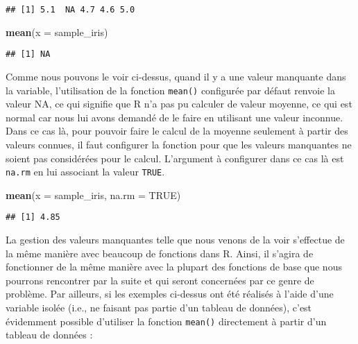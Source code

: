 \documentclass[
  french,
]{book}
\newenvironment{Shaded}{\begin{snugshade}}{\end{snugshade}}
\newcommand{\DataTypeTok}[1]{\textcolor[rgb]{0.13,0.29,0.53}{#1}}
\newcommand{\KeywordTok}[1]{\textcolor[rgb]{0.13,0.29,0.53}{\textbf{#1}}}
\newcommand{\NormalTok}[1]{#1}
\newcommand{\OperatorTok}[1]{\textcolor[rgb]{0.81,0.36,0.00}{\textbf{#1}}}
\newcommand{\OtherTok}[1]{\textcolor[rgb]{0.56,0.35,0.01}{#1}}
\begin{document}
\begin{verbatim}
## [1] 5.1  NA 4.7 4.6 5.0
\end{verbatim}

\begin{Shaded}
\begin{Highlighting}[]
\KeywordTok{mean}\NormalTok{(}\DataTypeTok{x =}\NormalTok{ sample_iris)}
\end{Highlighting}
\end{Shaded}

\begin{verbatim}
## [1] NA
\end{verbatim}

Comme nous pouvons le voir ci-dessus, quand il y a une valeur manquante dans la variable, l'utilisation de la fonction \texttt{mean()} configurée par défaut renvoie la valeur NA, ce qui signifie que R n'a pas pu calculer de valeur moyenne, ce qui est normal car nous lui avons demandé de le faire en utilisant une valeur inconnue. Dans ce cas là, pour pouvoir faire le calcul de la moyenne seulement à partir des valeurs connues, il faut configurer la fonction pour que les valeurs manquantes ne soient pas considérées pour le calcul. L'argument à configurer dans ce cas là est \texttt{na.rm} en lui associant la valeur \texttt{TRUE}.

\begin{Shaded}
\begin{Highlighting}[]
\KeywordTok{mean}\NormalTok{(}\DataTypeTok{x =}\NormalTok{ sample_iris, }\DataTypeTok{na.rm =} \OtherTok{TRUE}\NormalTok{)}
\end{Highlighting}
\end{Shaded}

\begin{verbatim}
## [1] 4.85
\end{verbatim}

La gestion des valeurs manquantes telle que nous venons de la voir s'effectue de la même manière avec beaucoup de fonctions dans R. Ainsi, il s'agira de fonctionner de la même manière avec la plupart des fonctions de base que nous pourrons rencontrer par la suite et qui seront concernées par ce genre de problème. Par ailleurs, si les exemples ci-dessus ont été réalisés à l'aide d'une variable isolée (i.e., ne faisant pas partie d'un tableau de données), c'est évidemment possible d'utiliser la fonction \texttt{mean()} directement à partir d'un tableau de données :

\begin{Shaded}
\end{Shaded}
\end{document}
